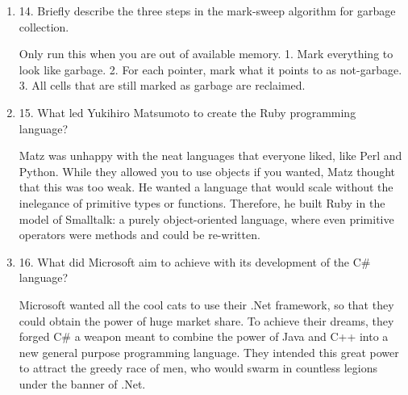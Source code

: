 \begin{enumerate}
\begin{answer}
    \end{answer}

  \item 14. Briefly describe the three steps in the mark-sweep algorithm
    for garbage collection.

  \begin{answer}

    Only run this when you are out of available memory.
    1. Mark everything to look like garbage.
    2. For each pointer, mark what it points to as not-garbage.
    3. All cells that are still marked as garbage are reclaimed. 

    \end{answer}

  \item 15. What led Yukihiro Matsumoto to create the Ruby programming language?

  \begin{answer}

    Matz was unhappy with the neat languages that everyone liked, like Perl and Python. While they allowed you to use objects if you wanted, Matz thought that this was too weak. He wanted a language that would scale without the inelegance of primitive types or functions. Therefore, he built Ruby in the model of Smalltalk: a purely object-oriented language, where even primitive operators were methods and could be re-written.

    \end{answer}

  \item 16. What did Microsoft aim to achieve with its development of the
    C\# language?

  \begin{answer}

    Microsoft wanted all the cool cats to use their .Net framework, so that they could obtain the power of huge market share. To achieve their dreams, they forged C# a weapon meant to combine the power of Java and C++ into a new general purpose programming language. They intended this great power to attract the greedy race of men, who would swarm in countless legions under the banner of .Net.

    \end{answer}

  \end{enumerate}


